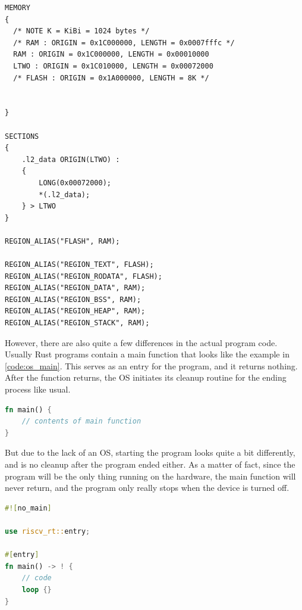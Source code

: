 \begin{lstlisting}[style=colorEX,caption={Example memory.x file},label={code:memory_x}]
MEMORY
{
  /* NOTE K = KiBi = 1024 bytes */
  /* RAM : ORIGIN = 0x1C000000, LENGTH = 0x0007fffc */
  RAM : ORIGIN = 0x1C000000, LENGTH = 0x00010000
  LTWO : ORIGIN = 0x1C010000, LENGTH = 0x00072000
  /* FLASH : ORIGIN = 0x1A000000, LENGTH = 8K */


}

SECTIONS
{
    .l2_data ORIGIN(LTWO) :
    {
        LONG(0x00072000);
        *(.l2_data);
    } > LTWO
}

REGION_ALIAS("FLASH", RAM);

REGION_ALIAS("REGION_TEXT", FLASH);
REGION_ALIAS("REGION_RODATA", FLASH);
REGION_ALIAS("REGION_DATA", RAM);
REGION_ALIAS("REGION_BSS", RAM);
REGION_ALIAS("REGION_HEAP", RAM);
REGION_ALIAS("REGION_STACK", RAM);

\end{lstlisting}


However, there are also quite a few differences in the actual program code. Usually Rust programs contain a main function that looks like the example in \ref{code:os_main}.
This serves as an entry for the program, and it returns nothing. After the function returns, the OS initiates its cleanup routine for the ending process like usual.

\begin{lstlisting}[style=colorEX,language=Rust,caption={Standard main function in Rust},label={code:os_main}]
fn main() {
    // contents of main function
}
\end{lstlisting}

But due to the lack of an OS, starting the program looks quite a bit differently, and is no cleanup after the program ended either.
As a matter of fact, since the program will be the only thing running on the hardware, the main function will never return, and the program
only really stops when the device is turned off.

\begin{lstlisting}[style=colorEX,language=Rust,caption={Example main function for the pulp-platform},label={code:embedded_main}]
#![no_main]

use riscv_rt::entry;

#[entry]
fn main() -> ! {
    // code
    loop {}
}
\end{lstlisting}

